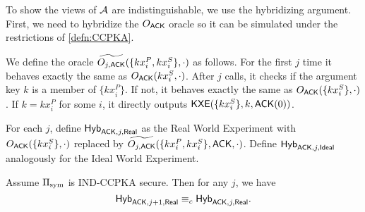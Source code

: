 To show the views of $\mathcal{A}$ are indistinguishable, we use the hybridizing argument. First, we need to hybridize the $O_{\mathsf{ACK}}$ oracle so it can be simulated under the restrictions of \cref{defn:CCPKA}. 
\begin{definition}
We define the oracle $\widetilde{O_{j, \mathsf{ACK}}}(\{kx_i^P, kx_i^S\}, \cdot)$ as follows. For the first $j$ time it behaves exactly the same as $O_{\mathsf{ACK}}(kx_i^S, \cdot)$. After $j$ calls, it checks if the argument key $k$ is a member of $\{kx_i^P\}$. If not, it behaves exactly the same as $O_{\mathsf{ACK}}(\{kx_i^S\}, \cdot)$. If $k = kx_i^P$ for some $i$, it directly outputs $\mathsf{KXE}(\{kx_i^S\}, k, \mathsf{ACK}(0))$.

    For each $j$, define $\mathsf{Hyb}_{\mathsf{ACK}, j, \mathsf{Real}}$ as the Real World Experiment with $O_{\mathsf{ACK}}(\{kx_i^S\}, \cdot)$ replaced by $\widetilde{O_{j, \mathsf{ACK}}}(\{kx_i^P, kx_i^S\}, \mathsf{ACK}, \cdot)$. Define $\mathsf{Hyb}_{\mathsf{ACK}, j, \mathsf{Ideal}}$ analogously for the Ideal World Experiment. 
\end{definition}
\begin{lemma}
     Assume $\Pi_{\text{sym}}$ is IND-CCPKA secure. Then for any $j$, we have 
    $$\mathsf{Hyb}_{\mathsf{ACK}, j + 1, \mathsf{Real}} \equiv_c \mathsf{Hyb}_{\mathsf{ACK}, j, \mathsf{Real}}.$$
\end{lemma}
